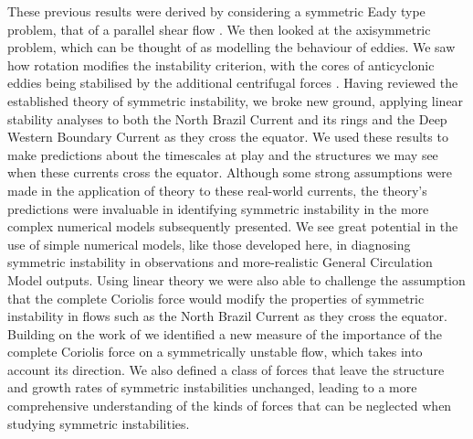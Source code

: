These previous results were derived by considering a symmetric Eady type problem, that of a parallel shear flow \citep{Eady1949, Ooyama1966, Hoskins1974, Stone1966}. We then looked at the axisymmetric problem, which can be thought of as modelling the behaviour of eddies. We saw how rotation modifies the instability criterion, with the cores of anticyclonic eddies being stabilised by the additional centrifugal forces \citep{Buckingham2021}. Having reviewed the established theory of symmetric instability, we broke new ground, applying linear stability analyses to both the North Brazil Current and its rings and the Deep Western Boundary Current as they cross the equator. We used these results to make predictions about the timescales at play and the structures we may see when these currents cross the equator. Although some strong assumptions were made in the application of theory to these real-world currents, the theory's predictions were invaluable in identifying symmetric instability in the more complex numerical models subsequently presented. We see great potential in the use of simple numerical models, like those developed here, in diagnosing symmetric instability in observations and more-realistic General Circulation Model outputs. Using linear theory we were also able to challenge the assumption that the complete Coriolis force would modify the properties of symmetric instability in flows such as the North Brazil Current as they cross the equator. Building on the work of \citet{Zeitlin2018a} we identified a new measure of the importance of the complete Coriolis force on a symmetrically unstable flow, which takes into account its direction. We also defined a class of forces that leave the structure and growth rates of symmetric instabilities unchanged, leading to a more comprehensive understanding of the kinds of forces that can be neglected when studying symmetric instabilities.

